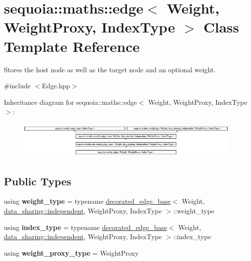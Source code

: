 \hypertarget{classsequoia_1_1maths_1_1edge}{}\section{sequoia\+::maths\+::edge$<$ Weight, Weight\+Proxy, Index\+Type $>$ Class Template Reference}
\label{classsequoia_1_1maths_1_1edge}


Stores the host node as well as the target node and an optional weight.  




{\ttfamily \#include $<$Edge.\+hpp$>$}

Inheritance diagram for sequoia\+::maths\+::edge$<$ Weight, Weight\+Proxy, Index\+Type $>$\+:\begin{figure}[H]
\begin{center}
\leavevmode
\includegraphics[height=1.869783cm]{classsequoia_1_1maths_1_1edge}
\end{center}
\end{figure}
\subsection*{Public Types}
\begin{DoxyCompactItemize}
\item 
\mbox{\label{classsequoia_1_1maths_1_1edge_a0bb3a77c0ebb078928bc0e62691ea18b}} 
using {\bfseries weight\+\_\+type} = typename \mbox{\hyperlink{classsequoia_1_1maths_1_1decorated__edge__base}{decorated\+\_\+edge\+\_\+base}}$<$ Weight, \mbox{\hyperlink{structsequoia_1_1data__sharing_1_1independent}{data\+\_\+sharing\+::independent}}, Weight\+Proxy, Index\+Type $>$\+::weight\+\_\+type
\item 
\mbox{\label{classsequoia_1_1maths_1_1edge_a4fa29b1772d78aa9474772b86d90f2c8}} 
using {\bfseries index\+\_\+type} = typename \mbox{\hyperlink{classsequoia_1_1maths_1_1decorated__edge__base}{decorated\+\_\+edge\+\_\+base}}$<$ Weight, \mbox{\hyperlink{structsequoia_1_1data__sharing_1_1independent}{data\+\_\+sharing\+::independent}}, Weight\+Proxy, Index\+Type $>$\+::index\+\_\+type
\item 
\mbox{\label{classsequoia_1_1maths_1_1edge_aef65c31dc020d46363cf41506968a10e}} 
using {\bfseries weight\+\_\+proxy\+\_\+type} = Weight\+Proxy
\end{DoxyCompactItemize}
